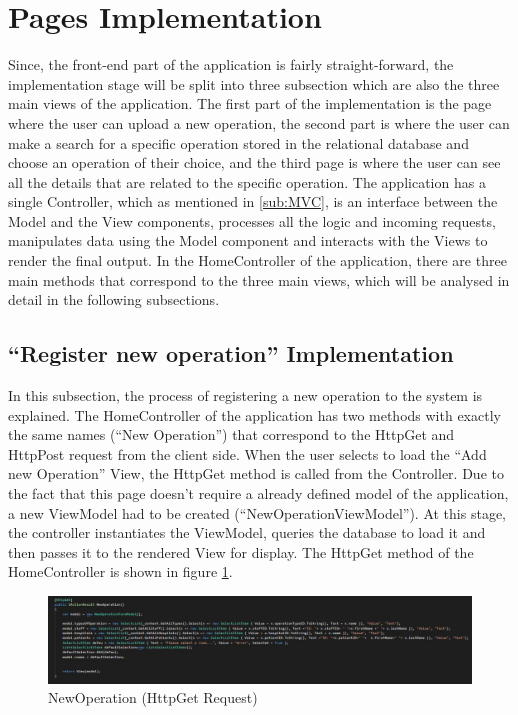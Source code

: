 \section{Pages Implementation}
\label{sec:pages_implementation}

Since, the front-end part of the application is fairly straight-forward, the implementation stage will be split into three subsection which are also the three main views of the application. The first part of the implementation is the page where the user can upload a new operation, the second part is where the user can make a search for a specific operation stored in the relational database and choose an operation of their choice, and the third page is where the user can see all the details that are related to the specific operation.
The application has a single Controller, which as mentioned in \ref{sub:MVC}, is an interface between the Model and the View components, processes all the logic and incoming requests, manipulates data using the Model component and interacts with the Views to render the final output. In the HomeController of the application, there are three main methods that correspond to the three main views, which will be analysed in detail in the following subsections. 


\subsection{``Register new operation'' Implementation}
\label{sub:register_new_operation_implementation}

In this subsection, the process of registering a new operation to the system is explained. The HomeController of the application has two methods with exactly the same names (``New Operation'') that correspond to the HttpGet and HttpPost request from the client side. When the user selects to load the ``Add new Operation'' View, the HttpGet method is called from the Controller. Due to the fact that this page doesn't require a already defined model of the application, a new ViewModel had to be created (``NewOperationViewModel''). 
At this stage, the controller instantiates the ViewModel, queries the database to load it and then passes it to the rendered View for display. The HttpGet method of the HomeController is shown in figure \ref{new_operation_get}.


\begin{figure}[!ht]
\begin{center}
\includegraphics[width=17cm]{imgs/new_operation_get.jpg}
\end{center}\vspace{-0.3cm}
\caption[NewOperation (HttpGet Request)]{NewOperation (HttpGet Request)} \label{new_operation_get}
\end{figure}


